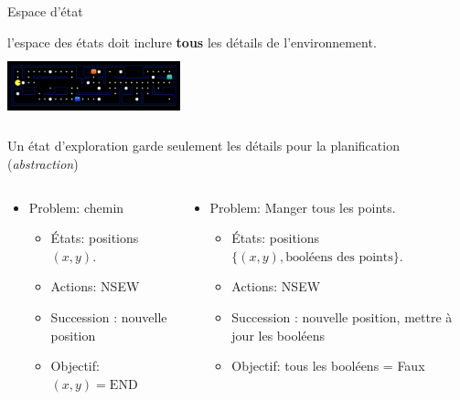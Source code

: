 \documentclass{beamer}
\begin{document}
\begin{frame}[t]{Espace d'état}
  
  \begin{block}{}
    \scriptsize
    l'\alert{espace des états} doit inclure \textbf{tous}  les détails de
    l'environnement.
    \centering
  \includegraphics[width=5cm,height=2cm]{./images/world_state_contents.png}
  \end{block}
  \pause
  \begin{block}{}
    \centering
    \scriptsize
    Un \alert{état d'exploration} garde seulement les détails pour la
    planification (\emph{abstraction}) 
    \pause
    \begin{columns}
      \begin{column}{0.5\textwidth}
        \begin{itemize}
          \item Problem: chemin
            \begin{itemize}
              \footnotesize
            \item États:  positions $(x,y)$.
            \item Actions: NSEW
            \item Succession : nouvelle position
            \item Objectif: $(x,y)=\text{END}$
            \end{itemize}
        \end{itemize} 
      \end{column}
      \pause
      \begin{column}{0.5\textwidth}
        \begin{itemize}
          \item Problem: Manger tous les points.
            \begin{itemize}
              \tiny
            \item États:  positions $\{(x,y),\text{booléens des points}\}$.
            \item Actions: NSEW
            \item Succession : nouvelle position, mettre à jour les booléens
            \item Objectif: tous les booléens = Faux
            \end{itemize}
        \end{itemize} 
      \end{column}
    \end{columns}
  \end{block}
\end{frame}
\end{document}
